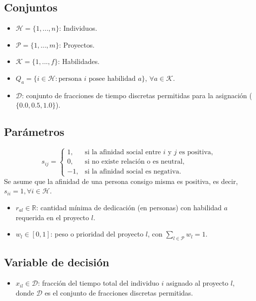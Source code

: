 \documentclass[conference]{IEEEtran}
\begin{document}
\subsection{Conjuntos}
\begin{itemize}
    \item $\mathcal{H} = \{1, ..., n\}$: Individuos.
    \item $\mathcal{P} = \{1, ..., m\}$: Proyectos.
    \item $\mathcal{K} = \{1, ..., f\}$: Habilidades.
    \item $Q_a = \{i \in \mathcal{H} : \text{persona } i \text{ posee habilidad } a\}$, $\forall a \in \mathcal{K}$.
    \item $\mathcal{D}$: conjunto de fracciones de tiempo discretas permitidas para la asignación ($\{0.0, 0.5, 1.0\}$).
\end{itemize}


\subsection{Parámetros}
\[
    s_{ij} =
    \begin{cases}
        1,  & \text{si la afinidad social entre } i \text{ y } j \text{ es positiva}, \\
        0,  & \text{si no existe relación o es neutral},                              \\
        -1, & \text{si la afinidad social es negativa}.
    \end{cases}
\]
Se asume que la afinidad de una persona consigo misma es positiva, es decir, \(s_{ii} = 1, \forall i \in \mathcal{H}\).

\begin{itemize}
    \item $r_{al} \in \mathbb{R}$: cantidad mínima de dedicación (en personas) con habilidad $a$ requerida en el proyecto $l$.
    \item $w_l \in [0,1]$: peso o prioridad del proyecto $l$, con $\sum_{l \in \mathcal{P}} w_l = 1$.
\end{itemize}

\subsection{Variable de decisión}

\begin{itemize}
    \item \(x_{il} \in \mathcal{D}\): fracción del tiempo total del individuo \(i\) asignado al proyecto \(l\), donde \(\mathcal{D}\) es el conjunto de fracciones discretas permitidas.
\end{itemize}
\end{document}
